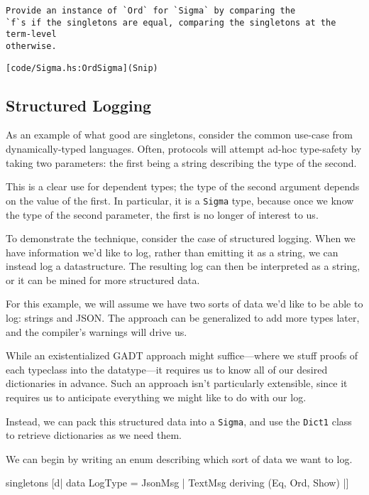 \documentclass[
  11pt,
]{book}
\newenvironment{Shaded}{}{}
\newcommand{\NormalTok}[1]{#1}
\theoremstyle{nonumberplain}
\begin{document}
\begin{verbatim}
Provide an instance of `Ord` for `Sigma` by comparing the
`f`s if the singletons are equal, comparing the singletons at the term-level
otherwise.
\end{verbatim}

\begin{verbatim}
[code/Sigma.hs:OrdSigma](Snip)
\end{verbatim}

\hypertarget{structured-logging}{%
\subsection{Structured Logging}\label{structured-logging}}

As an example of what good are singletons, consider the common use-case
from dynamically-typed languages. Often, protocols will attempt ad-hoc
type-safety by taking two parameters: the first being a string
describing the type of the second.

This is a clear use for dependent types; the type of the second argument
depends on the value of the first. In particular, it is a \texttt{Sigma}
type, because once we know the type of the second parameter, the first
is no longer of interest to us.

To demonstrate the technique, consider the case of structured logging.
When we have information we'd like to log, rather than emitting it as a
string, we can instead log a datastructure. The resulting log can then
be interpreted as a string, or it can be mined for more structured data.

For this example, we will assume we have two sorts of data we'd like to
be able to log: strings and JSON. The approach can be generalized to add
more types later, and the compiler's warnings will drive us.

While an existentialized GADT approach might suffice---where we stuff
proofs of each typeclass into the datatype---it requires us to know all
of our desired dictionaries in advance. Such an approach isn't
particularly extensible, since it requires us to anticipate everything
we might like to do with our log.

Instead, we can pack this structured data into a \texttt{Sigma}, and use
the \texttt{Dict1} class to retrieve dictionaries as we need them.

We can begin by writing an enum describing which sort of data we want to
log.

\begin{Shaded}
\begin{Highlighting}[]
\NormalTok{singletons [d|}
\NormalTok{  data LogType}
\NormalTok{    = JsonMsg}
\NormalTok{    | TextMsg}
\NormalTok{    deriving (Eq, Ord, Show)}
\NormalTok{  |]}
\end{Highlighting}
\end{Shaded}
\end{document}
